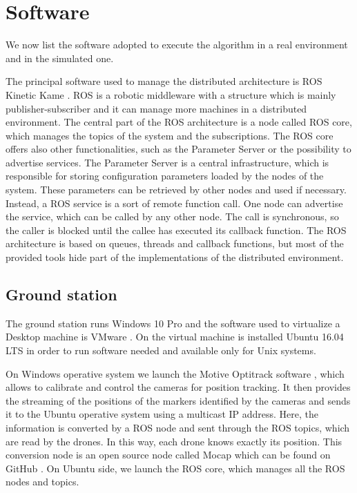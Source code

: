 \section{Software}

We now list the software adopted to execute the algorithm
in a real environment and in the simulated one.

The principal software used to manage the distributed architecture is ROS Kinetic
Kame \cite{ros}.
ROS is a robotic middleware with a structure which is mainly publisher-subscriber
and it can manage more machines in a distributed environment.
The central part of the ROS architecture is a node called ROS core, which manages
the topics of the system and the subscriptions.
The ROS core offers also other functionalities, such as the Parameter Server or the
possibility to advertise services.
The Parameter Server is a central infrastructure, which is responsible for storing
configuration parameters loaded by the nodes of the system.
These parameters can be retrieved by other nodes and used if necessary.
Instead, a ROS service is a sort of remote function call. One node can advertise
the service, which can be called by any other node. The call is synchronous,
so the caller is blocked until the callee has executed its callback function.
The ROS architecture is based on queues, threads and callback functions, but
most of the provided tools hide part of the implementations of the distributed
environment.


\subsection{Ground station}
The ground station runs Windows 10 Pro \cite{windows} and the software used to virtualize a
Desktop machine is VMware \cite{vmware}.
On the virtual machine is installed Ubuntu 16.04 LTS \cite{ubuntu} in order to run software
needed and available only for Unix systems.

On Windows operative system we launch the Motive Optitrack software \cite{optitrack},
which allows to calibrate and control the cameras for position tracking.
It then provides the streaming of the positions of the markers identified
by the cameras and sends it to the Ubuntu operative system using a multicast IP address.
Here, the information is converted by a ROS node and sent through the ROS topics,
which are read by the drones. In this way, each drone knows exactly its position.
This conversion node is an open source node called Mocap which can be found on GitHub \cite{mocap}.
On Ubuntu side, we launch the ROS core, which manages all the ROS nodes and topics.

